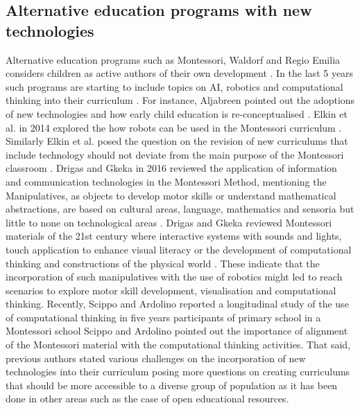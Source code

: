 \documentclass[conference]{IEEEtran}
\newcommand{\etal}{\textit{et al. }} %
\begin{document}
\subsection{Alternative education programs with new technologies}
Alternative education programs such as Montessori, Waldorf and Regio Emilia considers children as active authors of their own development \cite{edwards2002, MontessoriBOOK1969}.
In the last 5 years such programs are starting to include topics on AI, robotics and computational thinking into their curriculum \cite{elkin2014, Aljabreen2020}.
For instance, Aljabreen pointed out the adoptions of new technologies and how early child education is re-conceptualised \cite{Aljabreen2020}. 
Elkin et al. in 2014 explored the how robots can be used in the Montessori curriculum \cite{elkin2014}.
Similarly Elkin et al. posed the question on the revision of new curriculums that include technology should not deviate from the main purpose of the Montessori classroom \cite{elkin2014}.
Drigas and Gkeka in 2016 reviewed the application of information and communication technologies in the Montessori Method, mentioning the Manipulatives, as objects to develop motor skills or understand mathematical abstractions, are based on cultural areas, language, mathematics and sensoria but little to none on technological areas \cite{DrigasGkeka2016}.
Drigas and Gkeka reviewed Montessori materials of the 21st century where interactive systems with sounds and lights, touch application to enhance visual literacy or the development of computational thinking and constructions of the physical world \cite{DrigasGkeka2016}.
These indicate that the incorporation of such manipulatives with the use of robotics might led to reach scenarios to explore motor skill development, visualisation and computational thinking. 
Recently, Scippo and Ardolino reported a longitudinal study of the use of computational thinking in five years participants of primary school in a Montessori school \cite{ScippoArdolino2021}
Scippo and Ardolino pointed out the importance of alignment of the Montessori material with the computational thinking activities. 
That said, previous authors stated various challenges on the incorporation of new technologies into their curriculum posing more questions on creating curriculums that should be more accessible to a diverse group of population as it has been done in other areas such as the case of open educational resources.
\end{document}
